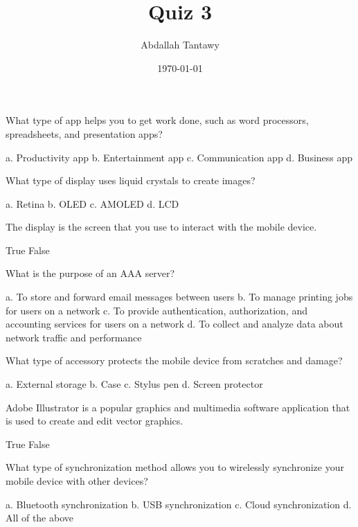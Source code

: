 \documentclass{exam}
\title{Quiz 3}
\author{Abdallah Tantawy}
\date{\today}
\begin{document}
\maketitle

\begin{questions}

\printanswers

\question What type of app helps you to get work done, such as word processors, spreadsheets, and presentation apps?
\begin{checkboxes}
\CorrectChoice a. Productivity app
\choice b. Entertainment app
\choice c. Communication app
\choice d. Business app
\end{checkboxes}

\question What type of display uses liquid crystals to create images?
\begin{checkboxes}
\choice a. Retina
\choice b. OLED
\choice c. AMOLED
\CorrectChoice d. LCD
\end{checkboxes}

\question The display is the screen that you use to interact with the mobile device.
\begin{checkboxes}
\CorrectChoice True
\choice False
\end{checkboxes}

\question What is the purpose of an AAA server?
\begin{checkboxes}
\choice a. To store and forward email messages between users
\choice b. To manage printing jobs for users on a network
\CorrectChoice c. To provide authentication, authorization, and accounting services for users on a network
\choice d. To collect and analyze data about network traffic and performance
\end{checkboxes}

\question What type of accessory protects the mobile device from scratches and damage?
\begin{checkboxes}
\choice a. External storage
\CorrectChoice b. Case
\choice c. Stylus pen
\choice d. Screen protector
\end{checkboxes}

\question Adobe Illustrator is a popular graphics and multimedia software application that is used to create and edit vector graphics.
\begin{checkboxes}
\CorrectChoice True
\choice False
\end{checkboxes}

\question What type of synchronization method allows you to wirelessly synchronize your mobile device with other devices?
\begin{checkboxes}
\CorrectChoice a. Bluetooth synchronization
\choice b. USB synchronization
\choice c. Cloud synchronization
\choice d. All of the above
\end{checkboxes}


\end{questions}
\end{document}
